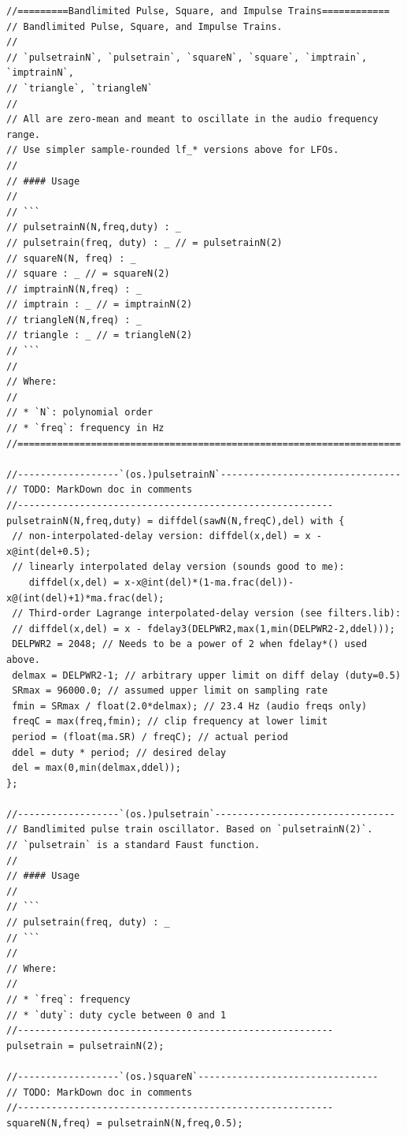\documentclass{article}
\begin{document}
\begin{lstlisting}[caption=\texttt{oscillators.lib}]
//=========Bandlimited Pulse, Square, and Impulse Trains============
// Bandlimited Pulse, Square, and Impulse Trains.
//
// `pulsetrainN`, `pulsetrain`, `squareN`, `square`, `imptrain`, `imptrainN`,
// `triangle`, `triangleN`
//
// All are zero-mean and meant to oscillate in the audio frequency range.
// Use simpler sample-rounded lf_* versions above for LFOs.
//
// #### Usage
//
// ```
// pulsetrainN(N,freq,duty) : _
// pulsetrain(freq, duty) : _ // = pulsetrainN(2)
// squareN(N, freq) : _
// square : _ // = squareN(2)
// imptrainN(N,freq) : _
// imptrain : _ // = imptrainN(2)
// triangleN(N,freq) : _
// triangle : _ // = triangleN(2)
// ```
//
// Where:
//
// * `N`: polynomial order
// * `freq`: frequency in Hz
//====================================================================

//------------------`(os.)pulsetrainN`--------------------------------
// TODO: MarkDown doc in comments
//--------------------------------------------------------
pulsetrainN(N,freq,duty) = diffdel(sawN(N,freqC),del) with {
 // non-interpolated-delay version: diffdel(x,del) = x - x@int(del+0.5);
 // linearly interpolated delay version (sounds good to me):
    diffdel(x,del) = x-x@int(del)*(1-ma.frac(del))-x@(int(del)+1)*ma.frac(del);
 // Third-order Lagrange interpolated-delay version (see filters.lib):
 // diffdel(x,del) = x - fdelay3(DELPWR2,max(1,min(DELPWR2-2,ddel)));
 DELPWR2 = 2048; // Needs to be a power of 2 when fdelay*() used above.
 delmax = DELPWR2-1; // arbitrary upper limit on diff delay (duty=0.5)
 SRmax = 96000.0; // assumed upper limit on sampling rate
 fmin = SRmax / float(2.0*delmax); // 23.4 Hz (audio freqs only)
 freqC = max(freq,fmin); // clip frequency at lower limit
 period = (float(ma.SR) / freqC); // actual period
 ddel = duty * period; // desired delay
 del = max(0,min(delmax,ddel));
};

//------------------`(os.)pulsetrain`--------------------------------
// Bandlimited pulse train oscillator. Based on `pulsetrainN(2)`.
// `pulsetrain` is a standard Faust function.
//
// #### Usage
//
// ```
// pulsetrain(freq, duty) : _
// ```
//
// Where:
//
// * `freq`: frequency
// * `duty`: duty cycle between 0 and 1
//--------------------------------------------------------
pulsetrain = pulsetrainN(2);

//------------------`(os.)squareN`--------------------------------
// TODO: MarkDown doc in comments
//--------------------------------------------------------
squareN(N,freq) = pulsetrainN(N,freq,0.5);


\end{lstlisting}
\end{document}
